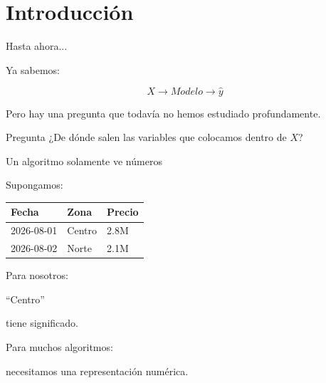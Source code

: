 \documentclass[aspectratio=169,11pt]{beamer}
\begin{document}
\section{Introducción}

\begin{frame}{Hasta ahora...}

Ya sabemos:

\[
X
\rightarrow
Modelo
\rightarrow
\hat y
\]

Pero hay una pregunta que todavía no hemos estudiado profundamente.

\vspace{0.6cm}

\begin{alertblock}{Pregunta}
¿De dónde salen las variables que colocamos dentro de $X$?
\end{alertblock}

\end{frame}


\begin{frame}{Un algoritmo solamente ve números}

Supongamos:

\begin{center}

\begin{tabular}{lll}
\toprule
Fecha & Zona & Precio \\
\midrule
2026-08-01 & Centro & 2.8M \\
2026-08-02 & Norte & 2.1M \\
\bottomrule
\end{tabular}

\end{center}

\vspace{0.5cm}

Para nosotros:

\begin{center}

``Centro''
\end{center}

tiene significado.

Para muchos algoritmos:

\begin{center}

\Large
necesitamos una representación numérica.
\end{center}

\end{frame}
\end{document}
